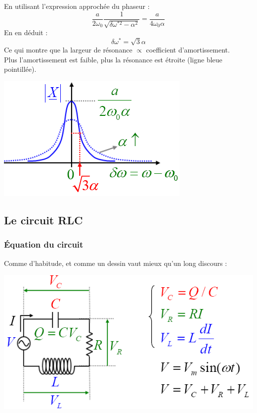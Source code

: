 \documentclass	[11pt, a4paper, openany]{book}
\begin{document}
	En utilisant l'expression approchée du phaseur :
	\begin{equation}
		\frac{a}{2\omega_0}\frac{1}{\sqrt{\delta\omega^{*2} - \alpha^2}} = \frac{a}{4\omega_0\alpha}
	\end{equation}
	En en déduit :
	\begin{equation}
		\delta\omega^* = \sqrt{3}\alpha
	\end{equation}
	Ce qui montre que la largeur de résonance $\propto$ coefficient d'amortissement.\\
	Plus l'amortissement est faible, plus la résonance est étroite (ligne bleue pointillée).
	\begin{center}
		\includegraphics[scale=0.5]{oo/image18.png}
	\end{center}
	\subsection{Le circuit RLC}
	\subsubsection{Équation du circuit}
	Comme d'habitude, et comme un dessin vaut mieux qu'un long discours :
	\begin{center}
		\includegraphics[scale=0.5]{oo/image19.png}
	\end{center}
	
\end{document}
